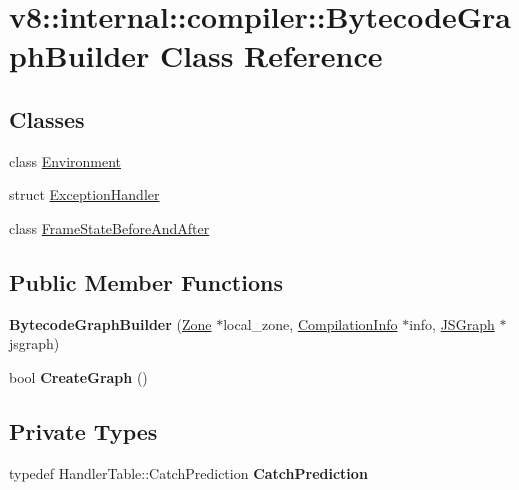 \hypertarget{classv8_1_1internal_1_1compiler_1_1_bytecode_graph_builder}{}\section{v8\+:\+:internal\+:\+:compiler\+:\+:Bytecode\+Graph\+Builder Class Reference}
\label{classv8_1_1internal_1_1compiler_1_1_bytecode_graph_builder}
\subsection*{Classes}
\begin{DoxyCompactItemize}
\item 
class \hyperlink{classv8_1_1internal_1_1compiler_1_1_bytecode_graph_builder_1_1_environment}{Environment}
\item 
struct \hyperlink{structv8_1_1internal_1_1compiler_1_1_bytecode_graph_builder_1_1_exception_handler}{Exception\+Handler}
\item 
class \hyperlink{classv8_1_1internal_1_1compiler_1_1_bytecode_graph_builder_1_1_frame_state_before_and_after}{Frame\+State\+Before\+And\+After}
\end{DoxyCompactItemize}
\subsection*{Public Member Functions}
\begin{DoxyCompactItemize}
\item 
{\bfseries Bytecode\+Graph\+Builder} (\hyperlink{classv8_1_1internal_1_1_zone}{Zone} $\ast$local\+\_\+zone, \hyperlink{classv8_1_1internal_1_1_compilation_info}{Compilation\+Info} $\ast$info, \hyperlink{classv8_1_1internal_1_1compiler_1_1_j_s_graph}{J\+S\+Graph} $\ast$jsgraph)\hypertarget{classv8_1_1internal_1_1compiler_1_1_bytecode_graph_builder_a056dc3c0e47633f538a764ea88b5068d}{}\label{classv8_1_1internal_1_1compiler_1_1_bytecode_graph_builder_a056dc3c0e47633f538a764ea88b5068d}

\item 
bool {\bfseries Create\+Graph} ()\hypertarget{classv8_1_1internal_1_1compiler_1_1_bytecode_graph_builder_a6aa238c003ba79320f2b115606a80224}{}\label{classv8_1_1internal_1_1compiler_1_1_bytecode_graph_builder_a6aa238c003ba79320f2b115606a80224}

\end{DoxyCompactItemize}
\subsection*{Private Types}
\begin{DoxyCompactItemize}
\item 
typedef Handler\+Table\+::\+Catch\+Prediction {\bfseries Catch\+Prediction}\hypertarget{classv8_1_1internal_1_1compiler_1_1_bytecode_graph_builder_a476bcbddb98ab38186d7b569429c9e7b}{}\label{classv8_1_1internal_1_1compiler_1_1_bytecode_graph_builder_a476bcbddb98ab38186d7b569429c9e7b}

\end{DoxyCompactItemize}
